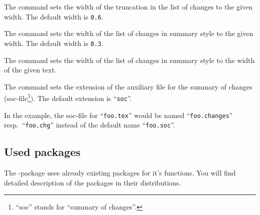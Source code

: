 
The command  sets the width of the truncation in the list of changes to the given width.
The default width is \texttt{0.6}.






The command  sets the width of the list of changes in summary style to the given width.
The default width is \texttt{0.3}.






The command  sets the width of the list of changes in summary style to the width of the given text.






The command  sets the extension of the auxiliary file for the summary of changes (soc-file\footnote{%
	``soc'' stands for ``summary of changes''.
}).
The default extension is ``\texttt{soc}''.

In the example, the soc-file for ``\texttt{foo.tex}'' would be named ``\texttt{foo.changes}'' resp.\ ``\texttt{foo.chg}'' instead of the default name ``\texttt{foo.soc}''.





\subsection{Used packages}
\label{sec:ui:packages}

The -package uses already existing packages for it's functions.
You will find detailed description of the packages in their distributions.

